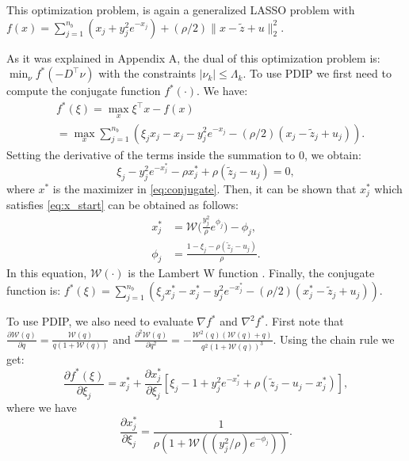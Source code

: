 \documentclass[letterpaper]{article} %
\begin{document}
This optimization problem, is again a generalized LASSO problem with
$f(x)=\sum_{j=1}^{n_b} (x_j + y_j^2e^{-x_j}) + (\rho/2) \lVert
x-\tilde{z} + u \lVert_2^2$.  

As it was explained in Appendix A, the dual of this optimization
problem is: $\min_\nu f^*(-D^\top\nu)$ with the constraints $|\nu_k|
\le \Lambda_k$. To use PDIP we first need to compute the conjugate
function $f^*(\cdot)$. We have: 
\begin{equation}
\begin{aligned}
&f^*(\xi)  = \max_x  \xi^\top x - f(x)\\
& =  \max_x \sum_{j=1}^{n_b} (\xi_jx_j - x_j - y_j^2e^{-x_j} -
(\rho/2)(x_j-\tilde{z}_j+u_j)). 
\end{aligned}
\label{eq:conjugate}
\end{equation}
Setting the derivative of the terms inside the summation to 0, we obtain:
\begin{equation}
\xi_j-y_j^2e^{-x_j^*}-\rho x_j^* + \rho (\tilde{z}_j-u_j)=0,
\label{eq:x_start}
\end{equation}
where $x^*$ is the maximizer in \ref{eq:conjugate}. Then, it
can be shown that $x_j^*$ which satisfies \eqref{eq:x_start} can be
obtained as follows: 
\begin{align}
x^*_j & = \mathscr{W}\bigg(\frac{y_j^2}{\rho} e^{\phi_j} \bigg) - \phi_j, \\
\phi_j & =\frac{1-\xi_j-\rho(\tilde{z}_j-u_j)}{\rho}.
\end{align}
In this equation, $\mathscr{W}(\cdot)$ is the Lambert W function \cite{corless_lambertw_1996}. Finally, the conjugate function is: $f^*(\xi) = \sum_{j=1}^{n_b} (\xi_jx^*_j - x^*_j - y_j^2e^{-x^*_j} - (\rho/2)(x^*_j-\tilde{z}_j+u_j))$.

To use PDIP, we also need to evaluate $\nabla f^*$ and $\nabla^2 f^*$. First note that $\frac{\partial \mathscr{W}(q)}{\partial q} = \frac{\mathscr{W}(q)}{q(1+\mathscr{W}(q))}$ and $\frac{\partial^2 \mathscr{W}(q)}{\partial q^2} = - \frac{\mathscr{W}^2(q)(\mathscr{W}(q)+q)}{q^2(1+\mathscr{W}(q))^3}$. Using the chain rule we get:
\begin{equation}
\frac{\partial f^*(\xi)}{\partial \xi_j}  =  x^*_j  + \frac{\partial
  x^*_j}{\partial \xi_j} \left[ \xi_j -1 + y_j^2 e^{-x_j^*} + \rho
  (\tilde{z}_j - u_j - x_j^*) \right], 
\label{eq:d_f*_start}
\end{equation}
where we have
\begin{equation}
\frac{\partial x_j^*}{\partial \xi_j}  = \frac{1}{\rho(1+\mathscr{W}((y_j^2/\rho) e^{-\phi_j} ))}.
\label{eq:d_x*_start}
\end{equation}
\end{document}
